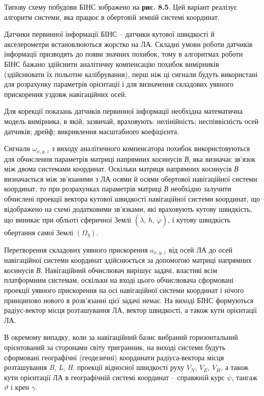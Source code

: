 Типову схему побудови БІНС зображено на \textbf{рис. 8.5}. Цей варіант реалізує алгоритм системи, 
яка працює в обертовій земній системі координат.

Датчики первинної інформації БІНС -- датчики кутової швидкості й акселерометри встановлюються 
жорстко на ЛА. Складні умови роботи датчиків інформації призводять до появи значних 
похибок, тому в алгоритмах роботи БІНС бажано здійснити аналітичну компенсацію похибок 
вимірників (здійснювати їх польотне калібрування), перш ніж ці сигнали будуть використані 
для розрахунку параметрів орієнтації і для визначення складових уявного прискорення 
уздовж навігаційних осей.

Для корекції показань датчиків первинної інформації необхідна математична модель 
вимірника, в якій, зазвичай, враховують: нелінійність; неспіввісність осей датчиків; 
дрейф; викривлення масштабного коефіцієнта.

Сигнали $\omega_{x,y,z}$ з виходу аналітичного компенсатора похибок використовуються 
для обчислення параметрів матриці напрямних  косинусів \textit{В}, яка визначає зв'язок 
між двома системами координат. Оскільки матриця напрямних  косинусів \textit{В} визначається 
між зв'язаними з ЛА осями й осями обертової навігаційної системи координат, то при 
розрахунках параметрів матриці \textit{В }необхідно залучити обчислені проекції вектора 
кутової швидкості навігаційної системи координат, що відображено на схемі додатковими 
зв'язками, які враховують кутову швидкість, що виникає при обльоті сферичної Землі $(
\dot{\lambda },\, \dot{h},\, \dot{\varphi })$, і кутову швидкість обертання самої 
Землі $(\Omega_{\text{З}} )$.

Перетворення складових уявного прискорення $a_{x,y,z}$  від осей ЛА до осей навігаційної 
системи координат здійснюється за допомогою матриці напрямних  косинусів \textit{В}. Навігаційний 
обчислювач вирішує задачі, властиві всім платформним системам, оскільки на вході 
цього обчислювача сформовані проекції уявного прискорення на осі навігаційної системи 
координат і нічого принципово нового в розв'язанні цієї задачі немає. На виході БІНС 
формуються радіус-вектор місця розташування ЛА, вектор швидкості, а також кути орієнтації 
ЛА. 

В окремому випадку, коли за навігаційний базис вибраний горизонтальний орієнтований 
за сторонами світу тригранник, на виході системи будуть сформовані географічні (геодезичні) 
координати радіуса-вектора місця розташування \textit{B}, \textit{L}, \textit{H}, проекції 
відносної швидкості руху $V_N$, $V_E$, $V_H$, а також 
кути орієнтації ЛА в географічній системі координат -- справжній курс $\psi$, тангаж $\vartheta$ і 
крен $\gamma$. 

